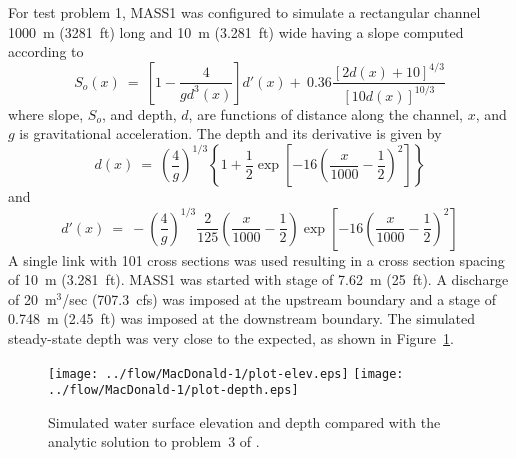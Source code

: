 \documentclass[12pt,dvips,letterpaper]{article}
\begin{document}
For test problem 1, MASS1 was configured to simulate a
rectangular channel 1000~m (3281~ft) long and 10~m (3.281~ft) wide
having a slope computed according to
\begin{equation}
  S_{o}\left( x \right) ~ = ~ \left[ 1 - \frac{4}{g d^{3}(x)} \right]
  d'\left( x \right) 
  + ~ 0.36 \frac{\left[ 2 d(x) + 10 \right]^{4 \slash 3}}{\left[10
  d(x) \right]^{10 \slash 3}} \nonumber  
\end{equation}
where slope, $S_{o}$, and depth, $d$, are functions of distance along
the channel, $x$, and $g$ is gravitational acceleration.  The depth
and its derivative is given by
\begin{equation}
  \label{eq:macdonald-1-depth}
  d \left( x \right) ~ = ~ \left( \frac{4}{g} \right)^{1 \slash 3} \left\{ 1 +
  \frac{1}{2} \exp \left[ -16 \left( \frac{x}{1000} - \frac{1}{2}
  \right)^{2} \right] \right\} 
\end{equation}
and 
\begin{equation}
  d' \left( x \right) ~ = ~ - \left( \frac{4}{g} \right)^{1 \slash
  3} \frac{2}{125} \left(  \frac{x}{1000} - \frac{1}{2} \right) \exp
  \left[ -16 \left( \frac{x}{1000} - \frac{1}{2} 
  \right)^{2} \right] \nonumber
\end{equation}
A single link with 101 cross sections was used resulting in a cross
section spacing of 10~m (3.281~ft).  MASS1 was started with stage of
7.62~m (25~ft). A discharge of 20~m$^{3}$/sec (707.3~cfs) was imposed
at the upstream boundary and a stage of 0.748~m (2.45~ft) was imposed
at the downstream boundary. The simulated steady-state depth was very
close to the expected, as shown in Figure~\ref{fig:macdonald-1}.

\begin{figure}[htbp]
  \centering
  \texttt{[image: ../flow/MacDonald-1/plot-elev.eps]}
  \texttt{[image: ../flow/MacDonald-1/plot-depth.eps]}
  \caption{Simulated water surface elevation and depth compared with the
    analytic solution to problem~3 of \cite{macdonald97:_analytic}.}
  \label{fig:macdonald-1}
\end{figure}
\end{document}
